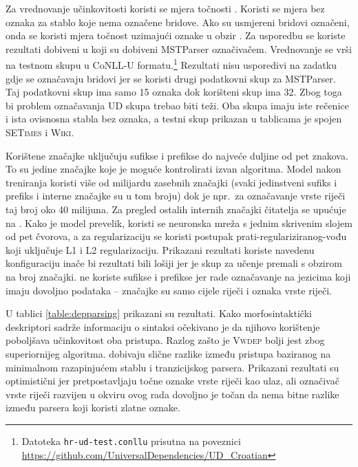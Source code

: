 Za vrednovanje učinkovitosti koristi se mjera točnosti . Koristi
se mjera bez oznaka  za stablo koje nema
označene bridove. Ako su usmjereni bridovi označeni, onda se koristi mjera
točnost uzimajući oznake u obzir . Za
usporedbu se koriste rezultati dobiveni u \citep{agic2013three} koji su dobiveni
MSTParser označivačem. Vrednovanje se vrši na testnom skupu u CoNLL-U
formatu.\footnote{Datoteka \texttt{hr-ud-test.conllu} prisutna na poveznici
\url{https://github.com/UniversalDependencies/UD_Croatian}} Rezultati nisu
usporedivi na zadatku gdje se označavaju bridovi jer se koristi drugi podatkovni
skup za MSTParser. Taj podatkovni skup ima samo 15 oznaka dok korišteni skup ima
32. Zbog toga bi problem označavanja UD skupa trebao biti teži. Oba skupa imaju
iste rečenice i ista ovisnosna stabla bez oznaka, a testni skup prikazan u
tablicama je spojen \textsc{SETimes} i \textsc{Wiki}.

Korištene značajke uključuju sufikse i prefikse do najveće duljine od pet
znakova. To su jedine značajke koje je moguće kontrolirati izvan algoritma.
Model nakon treniranja koristi više od milijardu zasebnih značajki (svaki
jedinstveni sufiks i prefiks i interne značajke su u tom broju) dok je npr.~za
označavanje vrste riječi taj broj oko 40 milijuna. Za pregled ostalih internih
značajki čitatelja se upućuje na \citep{chang2015learning}. Kako je model
prevelik, koristi se neuronska mreža s jednim skrivenim slojem od pet čvorova, a
za regularizaciju se koristi postupak prati-regulariziranog-vođu  koji uključuje L1 i L2 regularizaciju. Prikazani
rezultati koriste navedenu konfiguraciju inače bi rezultati bili lošiji jer je
skup za učenje premali s obzirom na broj značajki. \citet{chang2015learning} ne
koriste sufikse i prefikse jer rade označavanje na jezicima koji imaju dovoljno
podataka -- značajke su samo cijele riječi i oznaka vrste riječi.

U tablici \ref{table:depparsing} prikazani su rezultati. Kako morfosintaktički
deskriptori sadrže informaciju o sintaksi očekivano je da njihovo korištenje
poboljšava učinkovitost oba pristupa. Razlog zašto je \textsc{Vwdep} bolji jest
zbog superiornijeg algoritma. \citet{cer2010parsing} dobivaju slične razlike
između pristupa baziranog na minimalnom razapinjućem stablu i tranzicijskog
parsera. Prikazani rezultati su optimistični jer pretpostavljaju točne oznake
vrste riječi kao ulaz, ali označivač vrste riječi razvijen u okviru ovog rada
dovoljno je točan da nema bitne razlike između parsera koji koristi zlatne
oznake.

